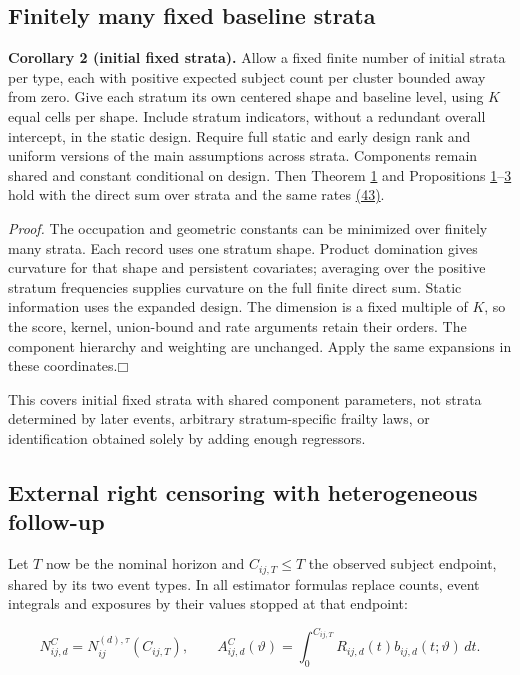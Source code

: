 \documentclass[11pt]{article}
\providecommand{\square}{\mdlgwhtsquare}
\begin{document}
\subsection{Finitely many fixed baseline strata}\label{sec:5.2}

\label{res:Corollary-2}
\textbf{Corollary 2 (initial fixed strata).} Allow a fixed finite number of initial strata per type, each with positive expected subject count per cluster bounded away from zero. Give each stratum its own centered shape and baseline level, using \(K\) equal cells per shape. Include stratum indicators, without a redundant overall intercept, in the static design. Require full static and early design rank and uniform versions of the main assumptions across strata. Components remain shared and constant conditional on design. Then Theorem \hyperref[res:Theorem-1]{1} and Propositions \hyperref[res:Proposition-1]{1}--\hyperref[res:Proposition-3]{3} hold with the direct sum over strata and the same rates \hyperref[eq:43]{(43)}.

\textit{Proof.} The occupation and geometric constants can be minimized over finitely many strata. Each record uses one stratum shape. Product domination gives curvature for that shape and persistent covariates; averaging over the positive stratum frequencies supplies curvature on the full finite direct sum. Static information uses the expanded design. The dimension is a fixed multiple of \(K\), so the score, kernel, union-bound and rate arguments retain their orders. The component hierarchy and weighting are unchanged. Apply the same expansions in these coordinates.\hfill$\square$

This covers initial fixed strata with shared component parameters, not strata determined by later events, arbitrary stratum-specific frailty laws, or identification obtained solely by adding enough regressors.

\subsection{External right censoring with heterogeneous follow-up}\label{sec:5.3}

Let \(T\) now be the nominal horizon and \(C_{ij,T}\leq T\) the observed subject endpoint, shared by its two event types. In all estimator formulas replace counts, event integrals and exposures by their values stopped at that endpoint:

\begin{equation*}
N_{ij,d}^C=N_{ij}^{(d),\tau}(C_{ij,T}),\qquad
A_{ij,d}^C(\vartheta)=\int_0^{C_{ij,T}}R_{ij,d}(t)b_{ij,d}(t;\vartheta)\,dt.
\tag{69}\label{eq:69}
\end{equation*}
\end{document}

